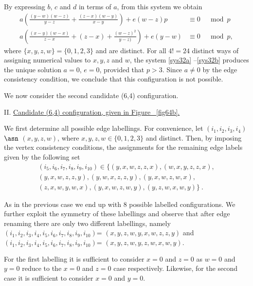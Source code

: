 {By expressing $b$, $c$ and $d$ in terms of $a$, from this system
we obtain
\begin{eqnarray}\label{sys32a}
a\left(\frac{(y-w)(w-z)}{y-z}+\frac{(z-x)(w-y)}{x-y} \right)+e(w-z)p &\equiv 0 &\mod p\\
\label{sys32b}a\left(\frac{(x-y)(w-x)}{z-x}+(z-x)+\frac{(w-z)^2}{y-z)}
\right)+e(y-w)&\equiv 0 &\mod p,
\end{eqnarray}
where $\{x,y,z,w\} =\{0,1,2,3\}$ and are distinct. For all $4!=24$
distinct ways of assigning numerical values to $x,y,z$ and $w$,
the system \eqref{sys32a} --\eqref{sys32b} produces the unique
solution $a=0$, $e=0$, provided that $p>3$. Since $a\neq 0$ by the
edge consistency condition, we conclude that this configuration is
not possible.

We now consider the second candidate (6,4) configuration.

II. \underline{Candidate (6,4) configuration, given in Figure
~\ref{fig64b}.}



We first determine all possible edge labellings. For convenience,
let $(i_1,i_2,i_3,i_4)$ $\asn$ $(x,y,z,w)$, where $x,y,z,w \in
\{0,1,2,3 \}$ and distinct. Then, by imposing the vertex consistency
conditions, the assignments for the remaining edge labels given by
the following set
\begin{eqnarray*}\label{tuples2} (i_5,i_6,i_7,i_8,i_9,i_{10}) \in
 \{(y,x,w,z,z,x),(w,x,y,z,z,x),\\
 (y,x,w,z,z,y),(y,w,x,z,z,y),(y,x,w,z,w,x),\\(z,x,w,y,w,x),(y,x,w,z,w,y),(y,z,w,x,w,y)\}~.
\end{eqnarray*}

As in the previous case we end up with 8 possible labelled
configurations. We further exploit the symmetry of these labellings
and observe that after edge renaming there are only two different
labellings, namely $(i_1,i_2,i_3,i_4,i_5,i_6,i_7,i_8,i_9,i_{10})$=
$(x,y,z,w,y,x,w,z,z,y)$ and
$(i_1,i_2,i_3,i_4,i_5,i_6,i_7,i_8,i_9,i_{10})$=
$(x,y,z,w,y,z,w,x,w,y)$.

For the first labelling it is sufficient to consider $x=0$ and
$z=0$ as $w=0$ and $y=0$ reduce to the $x=0$ and $z=0$ case
respectively. Likewise, for the second case it is sufficient to
consider $x=0$ and $y=0$.





}
